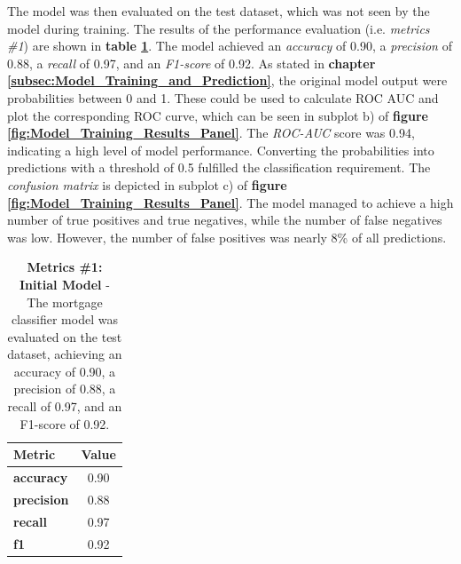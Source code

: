 The model was then evaluated on the test dataset, which was not seen by the model during training. The results of the performance evaluation (i.e. \textit{metrics \#1}) are shown in \textbf{table \ref{tab:Model_Evaluation}}. The model achieved an \textit{accuracy} of 0.90, a \textit{precision} of 0.88, a \textit{recall} of 0.97, and an \textit{F1-score} of 0.92. 
As stated in \textbf{chapter \ref{subsec:Model_Training_and_Prediction}}, the original model output were probabilities between 0 and 1. These could be used to calculate ROC AUC and plot the corresponding ROC curve, which can be seen in subplot b) of \textbf{figure \ref{fig:Model_Training_Results_Panel}}. The \textit{ROC-AUC} score was 0.94, indicating a high level of model performance. 
Converting the probabilities into predictions with a threshold of 0.5 fulfilled the classification requirement. The \textit{confusion matrix} is depicted in subplot c) of \textbf{figure \ref{fig:Model_Training_Results_Panel}}. The model managed to achieve a high number of true positives and true negatives, while the number of false negatives was low. However, the number of false positives was nearly 8\% of all predictions.

\begin{table}[!htbp]
    \centering
    \begin{tabular}{l c}
    \toprule
    \textbf{Metric} & \textbf{Value} \\
    \midrule
    \textbf{accuracy} & 0.90 \\
    \textbf{precision} & 0.88 \\
    \textbf{recall} & 0.97 \\
    \textbf{f1} & 0.92 \\
    \bottomrule
    \end{tabular}
    \medskip
    \caption[Metrics \#1: Initial Model]{\textbf{Metrics \#1: Initial Model} - The mortgage classifier model was evaluated on the test dataset, achieving an accuracy of 0.90, a precision of 0.88, a recall of 0.97, and an F1-score of 0.92.}
    \label{tab:Model_Evaluation}
\end{table}


